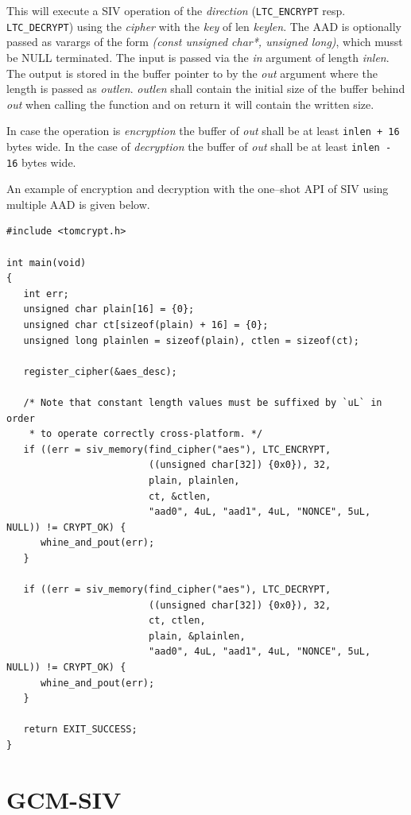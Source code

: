 \documentclass[synpaper]{book}
\newcommand{\mysection}[1]    %
	{                   %
	\section{#1}
   \markboth{\textsf{www.libtom.net}}{\thesection ~ {#1}}
	}
\begin{document}
This will execute a SIV operation of the \textit{direction} (\texttt{LTC\_ENCRYPT} resp. \texttt{LTC\_DECRYPT})
using the \textit{cipher} with the \textit{key} of len \textit{keylen}.
The AAD is optionally passed as varargs of the form \textit{(const unsigned char*, unsigned long)}, which musst be
NULL terminated.
The input is passed via the \textit{in} argument of length \textit{inlen}.
The output is stored in the buffer pointer to by the \textit{out} argument where the length is passed as \textit{outlen}.
\textit{outlen} shall contain the initial size of the buffer behind \textit{out} when calling the function and on
return it will contain the written size.

In case the operation is \textit{encryption} the buffer of \textit{out} shall be at least \texttt{inlen + 16} bytes wide.
In the case of \textit{decryption} the buffer of \textit{out} shall be at least \texttt{inlen - 16} bytes wide.

An example of encryption and decryption with the one--shot API of SIV using multiple AAD is given below.

\begin{small}
\begin{verbatim}
#include <tomcrypt.h>

int main(void)
{
   int err;
   unsigned char plain[16] = {0};
   unsigned char ct[sizeof(plain) + 16] = {0};
   unsigned long plainlen = sizeof(plain), ctlen = sizeof(ct);

   register_cipher(&aes_desc);

   /* Note that constant length values must be suffixed by `uL` in order
    * to operate correctly cross-platform. */
   if ((err = siv_memory(find_cipher("aes"), LTC_ENCRYPT,
                         ((unsigned char[32]) {0x0}), 32,
                         plain, plainlen,
                         ct, &ctlen,
                         "aad0", 4uL, "aad1", 4uL, "NONCE", 5uL, NULL)) != CRYPT_OK) {
      whine_and_pout(err);
   }

   if ((err = siv_memory(find_cipher("aes"), LTC_DECRYPT,
                         ((unsigned char[32]) {0x0}), 32,
                         ct, ctlen,
                         plain, &plainlen,
                         "aad0", 4uL, "aad1", 4uL, "NONCE", 5uL, NULL)) != CRYPT_OK) {
      whine_and_pout(err);
   }

   return EXIT_SUCCESS;
}
\end{verbatim}
\end{small}

\mysection{GCM-SIV}
\label{GCM-SIV}
\end{document}
